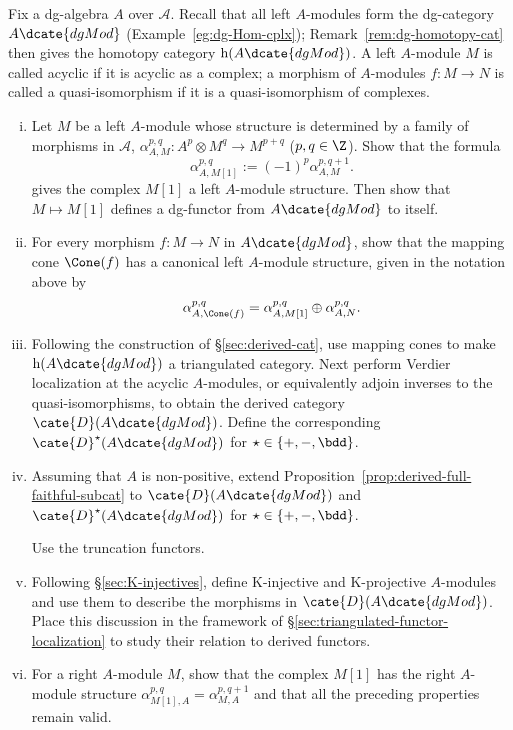 \begin{Exercises}
	\item Fix a dg-algebra $A$ over $\mathcal{A}$. Recall that all left
	$A$-modules form the dg-category $A\dcate{dgMod}$
	(Example~\ref{eg:dg-Hom-cplx}); Remark~\ref{rem:dg-homotopy-cat} then
	gives the homotopy category $\mathrm{h}(A\dcate{dgMod})$. A left
	$A$-module $M$ is called acyclic if it is acyclic as a complex; a
	morphism of $A$-modules $f:M\to N$ is called a quasi-isomorphism if it is
	a quasi-isomorphism of complexes.
	\begin{enumerate}[(i)]
		\item Let $M$ be a left $A$-module whose structure is determined by a
		family of morphisms in $\mathcal{A}$,
		$\alpha_{A,M}^{p,q}:A^p\otimes M^q\to M^{p+q}$ ($p,q\in\Z$). Show
		that the formula
		\[ \alpha_{A, M[1]}^{p, q} := (-1)^p \alpha_{A, M}^{p, q+1} . \]
		gives the complex $M[1]$ a left $A$-module structure. Then show that
		$M\mapsto M[1]$ defines a dg-functor from $A\dcate{dgMod}$ to itself.
		\item For every morphism $f:M\to N$ in $A\dcate{dgMod}$, show that
		the mapping cone $\Cone(f)$ has a canonical left $A$-module structure,
		given in the notation above by
		\[ \alpha_{A, \Cone(f)}^{p, q} = \alpha_{A, M[1]}^{p, q} \oplus \alpha_{A, N}^{p, q}. \]
		\item Following the construction of \S\ref{sec:derived-cat}, use
		mapping cones to make $\mathrm{h}(A\dcate{dgMod})$ a triangulated
		category. Next perform Verdier localization at the acyclic $A$-modules,
		or equivalently adjoin inverses to the quasi-isomorphisms, to obtain the
		derived category $\cate{D}(A\dcate{dgMod})$. Define the corresponding
		$\cate{D}^{\star}(A\dcate{dgMod})$ for
		$\star\in\{+,-,\bdd\}$.
		\item Assuming that $A$ is non-positive, extend
		Proposition~\ref{prop:derived-full-faithful-subcat} to
		$\cate{D}(A\dcate{dgMod})$ and
		$\cate{D}^{\star}(A\dcate{dgMod})$ for
		$\star\in\{+,-,\bdd\}$.
		\begin{hint}
			Use the truncation functors.
		\end{hint}
		\item Following \S\ref{sec:K-injectives}, define K-injective and
		K-projective $A$-modules and use them to describe the morphisms in
		$\cate{D}(A\dcate{dgMod})$. Place this discussion in the framework of
		\S\ref{sec:triangulated-functor-localization} to study their relation
		to derived functors.
		\item For a right $A$-module $M$, show that the complex $M[1]$ has the
		right $A$-module structure
		$\alpha_{M[1],A}^{p,q}=\alpha_{M,A}^{p,q+1}$ and that all the preceding
		properties remain valid.
	\end{enumerate}


\end{Exercises}
